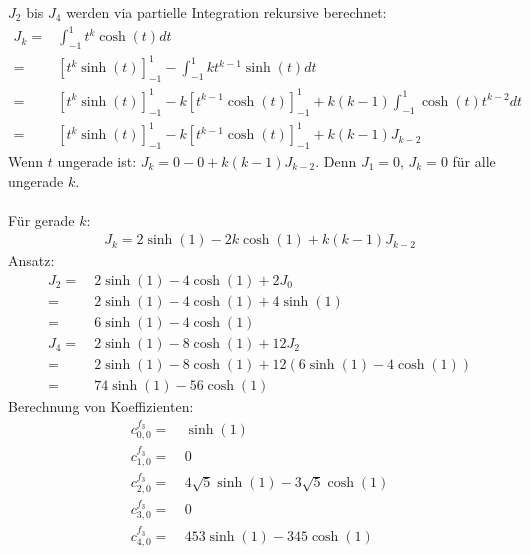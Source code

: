 $J_2$ bis $J_4$ werden via partielle Integration rekursive berechnet: 
\begin{align}
	J_k = & \int_{-1}^{1} t^k \cosh(t) dt \\
		= & \left[t^k\sinh(t)\right]_{-1}^{1} - \int_{-1}^{1}k t^{k-1} \sinh(t) dt \\
		= & \left[t^k\sinh(t)\right]_{-1}^{1} - k\left[t^{k-1}\cosh(t)\right]_{-1}^{1} + k(k-1)\int_{-1}^{1} \cosh(t)t^{k-2}dt \\
		= & \left[t^k\sinh(t)\right]_{-1}^{1} - k\left[t^{k-1}\cosh(t)\right]_{-1}^{1} + k(k-1)J_{k-2}
\end{align}
Wenn $t$ ungerade ist: $J_k = 0-0+k(k-1)J_{k-2}$. Denn $J_1 = 0$, $J_k = 0$ für alle ungerade $k$. \\\\
Für gerade $k$:
\begin{align}
	J_k = 2\sinh(1) - 2k\cosh(1) + k(k-1)J_{k-2} 
\end{align}
Ansatz:
\begin{align}
	J_2 = \ & 2\sinh(1) - 4\cosh(1) + 2J_0 \\
	= \ & 2\sinh(1) - 4\cosh(1) + 4 \sinh(1) \\
	= \ & 6\sinh(1) - 4\cosh(1) \\
	J_4 = \ & 2\sinh(1) - 8\cosh(1) + 12 J_2\\
		= \ & 2\sinh(1) - 8\cosh(1) + 12 (6\sinh(1) - 4\cosh(1))\\
		= \ & 74 \sinh(1) - 56\cosh(1)
\end{align}
Berechnung von Koeffizienten:
\begin{align}
	c_{0,0}^{f_3} = \ & \sinh(1) \\
	c_{1,0}^{f_3} = \ & 0 \\
	c_{2,0}^{f_3} = \ & 4\sqrt{5}\sinh(1) - 3\sqrt{5} \cosh(1) \\
	c_{3,0}^{f_3} = \ & 0 \\
	c_{4,0}^{f_3} = \ & 453\sinh(1) - 345\cosh(1)
\end{align}
